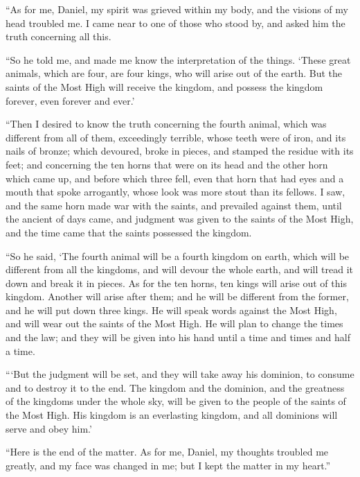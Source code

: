  ``As for me, Daniel, my spirit was grieved within my body,
and the visions of my head troubled me.  I came near to one
of those who stood by, and asked him the truth concerning all this.

``So he told me, and made me know the interpretation of the things.
 `These great animals, which are four, are four kings, who
will arise out of the earth.  But the saints of the Most
High will receive the kingdom, and possess the kingdom forever, even
forever and ever.'

 ``Then I desired to know the truth concerning the fourth
animal, which was different from all of them, exceedingly terrible,
whose teeth were of iron, and its nails of bronze; which devoured, broke
in pieces, and stamped the residue with its feet;  and
concerning the ten horns that were on its head and the other horn which
came up, and before which three fell, even that horn that had eyes and a
mouth that spoke arrogantly, whose look was more stout than its fellows.
 I saw, and the same horn made war with the saints, and
prevailed against them,  until the ancient of days came,
and judgment was given to the saints of the Most High, and the time came
that the saints possessed the kingdom.

 ``So he said, `The fourth animal will be a fourth kingdom
on earth, which will be different from all the kingdoms, and will devour
the whole earth, and will tread it down and break it in pieces.
 As for the ten horns, ten kings will arise out of this
kingdom. Another will arise after them; and he will be different from
the former, and he will put down three kings.  He will
speak words against the Most High, and will wear out the saints of the
Most High. He will plan to change the times and the law; and they will
be given into his hand until a time and times and half a time.

 ```But the judgment will be set, and they will take away
his dominion, to consume and to destroy it to the end.  The
kingdom and the dominion, and the greatness of the kingdoms under the
whole sky, will be given to the people of the saints of the Most High.
His kingdom is an everlasting kingdom, and all dominions will serve and
obey him.'

 ``Here is the end of the matter. As for me, Daniel, my
thoughts troubled me greatly, and my face was changed in me; but I kept
the matter in my heart.''

